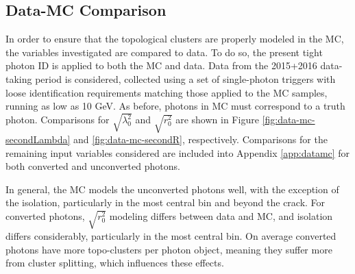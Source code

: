 \subsection{Data-MC Comparison} \label{ssec:yid-datamc}
In order to ensure that the topological clusters are properly modeled in the \gls{MC}, the variables investigated are compared to data. To do so, the present tight photon ID is applied to both the \gls{MC} and data. Data from the 2015+2016 data-taking period is considered, collected using a set of single-photon triggers with loose identification requirements matching those applied to the \gls{MC} samples, running as low as 10 GeV. As before, photons in \gls{MC} must correspond to a truth photon. Comparisons for $\sqrt{\lambda_{0}^2}$ and $\sqrt{r_{0}^2}$ are shown in Figure \ref{fig:data-mc-secondLambda} and \ref{fig:data-mc-secondR}, respectively. Comparisons for the remaining input variables considered are included into Appendix \ref{app:datamc} for both converted and unconverted photons.

In general, the \gls{MC} models the unconverted photons well, with the exception of the isolation, particularly in the most central bin and beyond the crack. For converted photons, $\sqrt{r_{0}^2}$ modeling differs between data and \gls{MC}, and isolation differs considerably, particularly in the most central bin. On average converted photons have more topo-clusters per photon object, meaning they suffer more from cluster splitting, which influences these effects.


